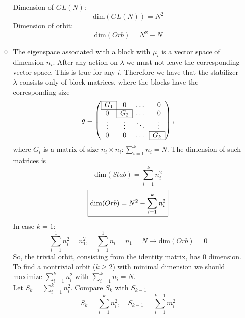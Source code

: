 \documentclass[12pt]{article}
\theoremstyle{definition}
\begin{document}
\begin{enumerate}
\begin{itemize}
    Dimension of $GL(N)$:
    \begin{equation}
        \text{dim}(GL(N))=N^2
    \end{equation}
    Dimension of orbit:
    \begin{equation}
        \boxed{\text{dim}(Orb)=N^2-N}
    \end{equation}
    \item The eigenspace associated with a block with $\mu_i$ is a vector space of dimension $n_i$. After any action on $\lambda$ we must not leave the corresponding vector space. This is true for any $i$. Therefore we have that the stabilizer $\lambda$ consists only of block matrices, where the blocks have the corresponding size
    \begin{equation}
        g = \left(\begin{array}{@{}cccc@{}}
		\cline{1-1}
		\multicolumn{1}{|c|}{G_1} & 0 & \dots & 0\\
		\cline{1-2}
		0 & \multicolumn{1}{|c|}{G_2} & \dots & 0\\
		\cline{2-2}
		\vdots & \vdots & \ddots & \vdots\\
		\cline{4-4}
		0 & 0 & \dots & \multicolumn{1}{|c|}{G_k}\\
		\cline{4-4}
	\end{array}\right),
    \end{equation}
    where $G_i$ is a matrix of size $n_i \times n_i:\sum\limits_{i=1}^kn_i=N$. The dimension of such matrices is 
    \begin{equation}
        \text{dim}(Stab) = \sum_{i=1}^{k}n_i^2
    \end{equation}
    \begin{equation}
        \boxed{\text{dim}(Orb)=N^2-\sum_{i=1}^k\limits n_i^2}
    \end{equation}
    In case $k=1$:
    \begin{equation}
        \sum\limits_{i=1}^1n_i^2=n_1^2,\quad \sum\limits_{i=1}^1n_i=n_1=N\rightarrow\text{dim}(Orb)=0
    \end{equation}
    So, the trivial orbit, consisting from the identity matrix, has 0 dimension. To find a nontrivial orbit ($k\geq2$) with minimal dimension we should maximize $\sum\limits_{i=1}^kn_i^2$ with $\sum\limits_{i=1}^kn_i=N$.\\
    Let $S_k=\sum\limits_{i=1}^kn_i^2$. Compare $S_k$ with $S_{k-1}$
    \begin{equation}
        S_k=\sum_{i=1}^{k}n_i^2,\quad S_{k-1}=\sum_{i=1}^{k-1}m_i^2
    \end{equation}

\end{itemize}
\end{enumerate}
\end{document}
